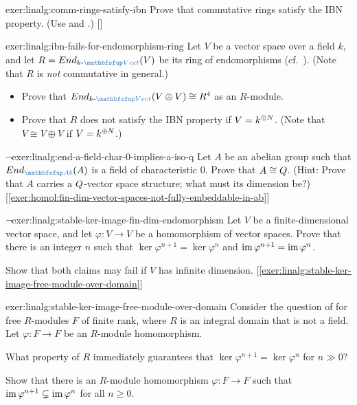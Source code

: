 \begin{exer}{\exerused}{exer:linalg:comm-rings-satisfy-ibn}
  Prove that commutative rings satisfy the IBN property. (Use
   and
  .)
  []
\end{exer}
\begin{exer}{}{exer:linalg:ibn-fails-for-endomorphism-ring}
  Let $V$ be a vector space over a field $k$, and let
  $R = \End_{k\text{-}\categ{Vect}}(V)$ be its ring of endomorphisms
  (cf.\ ). (Note that $R$ is
  \emph{not} commutative in general.)
  \begin{itemize}
  \item Prove that
    $\End_{k\text{-}\categ{Vect}}(V \oplus V) \cong R^4$ as an
    $R$-module.
  \item Prove that $R$ does not satisfy the IBN property if
    $V = k^{\oplus N}$. (Note that $V \cong V \oplus V$ if
    $V = k^{\oplus N}$.)
  \end{itemize}
\end{exer}
\begin{exer}{$\lnot$}{exer:linalg:end-a-field-char-0-implies-a-iso-q}
  Let $A$ be an abelian group such that $\End_{\categ{Ab}}(A)$ is a
  field of characteristic $0$. Prove that $A \cong Q$.  (Hint: Prove
  that $A$ carries a $Q$-vector space structure; what must its
  dimension be?)
  [\ref{exer:homol:fin-dim-vector-spaces-not-fully-embeddable-in-ab}]
\end{exer}
\begin{exer}{$\lnot$}{exer:linalg:stable-ker-image-fin-dim-endomorphism}
  Let $V$ be a finite-dimensional vector space, and let
  $\varphi : V \to V$ be a homomorphism of vector spaces. Prove that
  there is an integer $n$ such that
  $\ker\varphi^{n+1} = \ker\varphi^n$ and
  $\operatorname{im}\varphi^{n+1} = \operatorname{im}\varphi^n$.

  Show that both claims may fail if $V$ has infinite
  dimension. [\ref{exer:linalg:stable-ker-image-free-module-over-domain}]
\end{exer}
\begin{exer}{}{exer:linalg:stable-ker-image-free-module-over-domain}
  Consider the question of
   for free
  $R$-modules $F$ of finite rank, where $R$ is an integral domain that
  is not a field. Let $\varphi : F \to F$ be an $R$-module
  homomorphism.

  What property of $R$ immediately guarantees that
  $\ker\varphi^{n+1} = \ker\varphi^n$ for $n \gg 0$?

  Show that there is an $R$-module homomorphism $\varphi : F \to F$
  such that $\operatorname{im}\varphi^{n+1} \subsetneq \operatorname{im}\varphi^n$ for all
  $n \geq 0$.
\end{exer}

